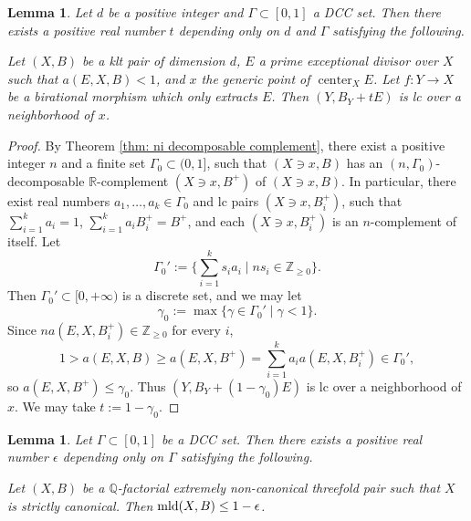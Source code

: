 \documentclass[11pt]{amsart}
\numberwithin{equation}{section}
\newcommand{\Qq}{\mathbb{Q}}
\newcommand{\Rr}{\mathbb{R}}
\newcommand{\Zz}{\mathbb{Z}}
\newcommand{\Center}{\operatorname{center}}
\newcommand{\mld}{{\rm{mld}}}
\newcommand{\Ii}{{\Gamma}}
\newtheorem{lem}[thm]{Lemma}
\theoremstyle{definition}
\theoremstyle{definition}
\begin{document}
\begin{lem}\label{lem: low bound lct by complement} Let $d$ be a positive integer and $\Ii\subset [0,1]$ a DCC set. Then there exists a positive real number $t$ depending only on $d$ and $\Ii$ satisfying the following.

Let $(X,B)$ be a klt pair of dimension $d$, $E$ a prime exceptional divisor over $X$ such that $a(E,X,B)<1$, and $x$ the generic point of $\Center_XE$. Let $f: Y\rightarrow X$ be a birational morphism which only extracts $E$. Then $(Y,B_Y+tE)$ is lc over a neighborhood of $x$.
\end{lem}
\begin{proof}
By Theorem \ref{thm: ni decomposable complement}, there exist a positive integer $n$ and a finite set $\Ii_0\subset (0,1]$, such that $(X\ni x,B)$ has an $(n,\Ii_0)$-decomposable $\Rr$-complement $(X\ni x,B^+)$ of $(X\ni x,B)$. In particular, there exist real numbers $a_1,\dots,a_k\in\Ii_0$ and lc pairs $(X\ni x,B_i^+)$, such that $\sum_{i=1}^ka_i=1$, $\sum_{i=1}^ka_iB_i^+=B^+$, and each $(X\ni x,B_i^+)$ is an $n$-complement of itself. Let
$$\Ii_0':=\{\sum_{i=1}^k s_ia_i\mid ns_i\in\Zz_{\geq 0}\}.$$
Then $\Ii_0'\subset [0,+\infty)$ is a discrete set, and we may let
$$\gamma_0:=\max\{\gamma\in\Ii_0'\mid \gamma<1\}.$$
Since $na(E,X,B_i^+)\in\Zz_{\ge0}$ for every $i$, $$1>a(E,X,B)\geq a(E,X,B^+)=\sum_{i=1}^ka_ia(E,X,B_i^+)\in\Ii_0',$$
so $a(E,X,B^+)\leq \gamma_0$. Thus $(Y,B_Y+(1-\gamma_0)E)$ is lc over a neighborhood of $x$. We may take $t:=1-\gamma_0$.
\end{proof}


\begin{lem}\label{lem: 1-gam canonical extreme case}
Let $\Ii\subset [0,1]$ be a DCC set. Then there exists a positive real number $\epsilon$ depending only on $\Ii$ satisfying the following.

Let $(X,B)$ be a $\Qq$-factorial extremely non-canonical threefold pair such that $X$ is strictly canonical. Then $\mld(X,B)\leq 1-\epsilon$. 
\end{lem}
\end{document}
